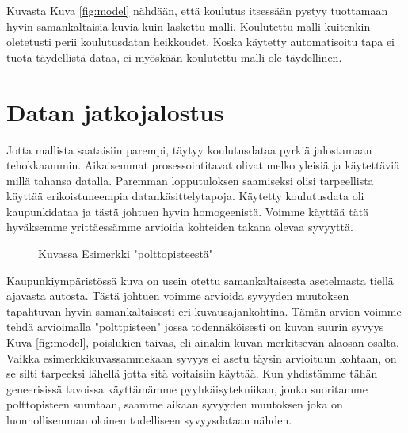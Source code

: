 Kuvasta Kuva \ref{fig:model} nähdään, että koulutus itsessään pystyy tuottamaan hyvin samankaltaisia kuvia kuin laskettu malli. Koulutettu malli kuitenkin oletetusti perii koulutusdatan heikkoudet. Koska käytetty automatisoitu tapa ei tuota täydellistä dataa, ei myöskään koulutettu malli ole täydellinen. 

\section{Datan jatkojalostus}

Jotta mallista saataisiin parempi, täytyy koulutusdataa pyrkiä jalostamaan tehokkaammin. 
Aikaisemmat prosessointitavat olivat melko yleisiä ja käytettäviä millä tahansa datalla.
Paremman lopputuloksen saamiseksi olisi tarpeellista käyttää erikoistuneempia datankäsittelytapoja.
Käytetty koulutusdata oli kaupunkidataa ja tästä johtuen hyvin homogeenistä.
Voimme käyttää tätä hyväksemme yrittäessämme arvioida kohteiden takana olevaa syvyyttä.

\begin{figure}[h]
\centering
{}
\caption{Kuvassa Esimerkki "polttopisteestä"}
\label{fig:polttopiste}
\end{figure}


Kaupunkiympäristössä kuva on usein otettu samankaltaisesta asetelmasta tiellä ajavasta autosta. 
Tästä johtuen voimme arvioida syvyyden muutoksen tapahtuvan hyvin samankaltaisesti eri kuvausajankohtina.
Tämän arvion voimme tehdä arvioimalla "polttpisteen" jossa todennäköisesti on kuvan suurin syvyys Kuva \ref{fig:model},
poislukien taivas, eli ainakin kuvan merkitsevän alaosan osalta.
Vaikka esimerkkikuvassammekaan syvyys ei asetu täysin arvioituun kohtaan,
on se silti tarpeeksi lähellä jotta sitä voitaisiin käyttää. 
Kun yhdistämme tähän geneerisissä tavoissa käyttämämme pyyhkäisytekniikan, jonka suoritamme polttopisteen suuntaan, 
saamme aikaan syvyyden muutoksen joka on luonnollisemman oloinen todelliseen syvyysdataan nähden.

